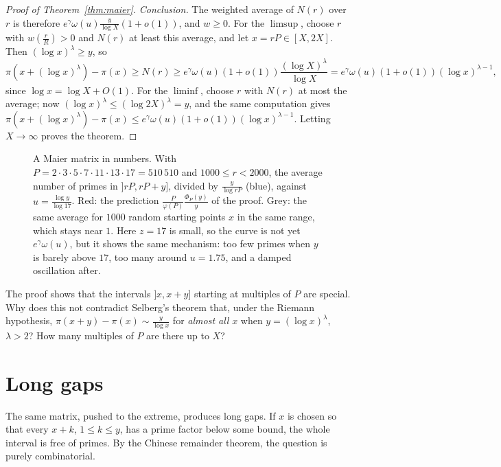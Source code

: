 \begin{proof}[Proof of Theorem~\ref{thm:maier}]
\emph{Conclusion.} The weighted average of $N(r)$ over $r$ is therefore $e^\gamma\omega(u)\frac y{\log X}(1+o(1))$, and $w\ge0$. For the $\limsup$, choose $r$ with $w(\frac rR)>0$ and $N(r)$ at least this average, and let $x=rP\in[X,2X]$. Then $(\log x)^\lambda\ge y$, so
\[
\pi(x+(\log x)^\lambda)-\pi(x)\ge N(r)\ge e^\gamma\omega(u)(1+o(1))\frac{(\log X)^\lambda}{\log X}=e^\gamma\omega(u)(1+o(1))(\log x)^{\lambda-1},
\]
since $\log x=\log X+O(1)$. For the $\liminf$, choose $r$ with $N(r)$ at most the average; now $(\log x)^\lambda\le(\log2X)^\lambda=y$, and the same computation gives $\pi(x+(\log x)^\lambda)-\pi(x)\le e^\gamma\omega(u)(1+o(1))(\log x)^{\lambda-1}$. Letting $X\to\infty$ proves the theorem.
\end{proof}

\begin{figure}[ht]
\centering{}
\caption{A Maier matrix in numbers. With $P=2\cdot3\cdot5\cdot7\cdot11\cdot13\cdot17=510\,510$ and $1000\le r<2000$, the average number of primes in $]rP,rP+y]$, divided by $\frac y{\log rP}$ (blue), against $u=\frac{\log y}{\log17}$. Red: the prediction $\frac{P}{\varphi(P)}\frac{\Phi_P(y)}y$ of the proof. Grey: the same average for $1000$ random starting points $x$ in the same range, which stays near $1$. Here $z=17$ is small, so the curve is not yet $e^\gamma\omega(u)$, but it shows the same mechanism: too few primes when $y$ is barely above $17$, too many around $u=1.75$, and a damped oscillation after.}
\label{fig:maier}
\end{figure}

\begin{think}
The proof shows that the intervals $]x,x+y]$ starting at multiples of $P$ are special. Why does this not contradict Selberg's theorem that, under the Riemann hypothesis, $\pi(x+y)-\pi(x)\sim\frac y{\log x}$ for \emph{almost all} $x$ when $y=(\log x)^\lambda$, $\lambda>2$? How many multiples of $P$ are there up to $X$?
\end{think}

\section{Long gaps}

The same matrix, pushed to the extreme, produces long gaps. If $x$ is chosen so that every $x+k$, $1\le k\le y$, has a prime factor below some bound, the whole interval is free of primes. By the Chinese remainder theorem, the question is purely combinatorial.


